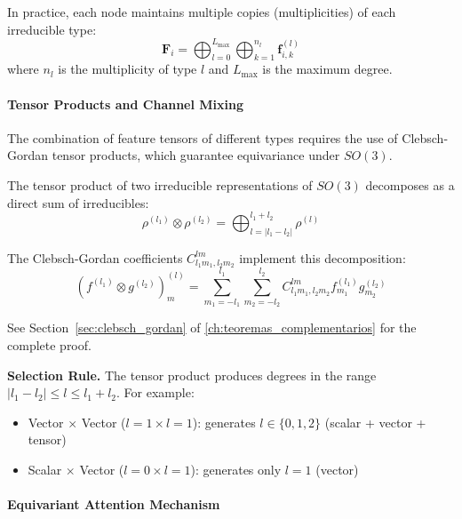 In practice, each node maintains multiple copies (multiplicities) of each irreducible type:
\begin{equation}
\mathbf{F}_i = \bigoplus_{l=0}^{L_{\max}} \bigoplus_{k=1}^{n_l} \mathbf{f}_{i,k}^{(l)}
\end{equation}
where $n_l$ is the multiplicity of type $l$ and $L_{\max}$ is the maximum degree.

\paragraph{Tensor Products and Channel Mixing}

The combination of feature tensors of different types requires the use of Clebsch-Gordan tensor products, which guarantee equivariance under $SO(3)$.

\begin{theorem}\label{thm:clebsch_gordan}
The tensor product of two irreducible representations of $SO(3)$ decomposes as a direct sum of irreducibles:
\begin{equation}
\rho^{(l_1)} \otimes \rho^{(l_2)} = \bigoplus_{l=|l_1-l_2|}^{l_1+l_2} \rho^{(l)}
\end{equation}

The Clebsch-Gordan coefficients $C_{l_1 m_1, l_2 m_2}^{l m}$ implement this decomposition:
\begin{equation}
(f^{(l_1)} \otimes g^{(l_2)})^{(l)}_m = \sum_{m_1=-l_1}^{l_1} \sum_{m_2=-l_2}^{l_2} C_{l_1 m_1, l_2 m_2}^{l m} f^{(l_1)}_{m_1} g^{(l_2)}_{m_2}
\end{equation}

See Section~\ref{sec:clebsch_gordan} of \autoref{ch:teoremas_complementarios} for the complete proof.
\end{theorem}

\textbf{Selection Rule.} The tensor product produces degrees in the range $|l_1 - l_2| \leq l \leq l_1 + l_2$. For example:
\begin{itemize}
    \item Vector $\times$ Vector ($l=1 \times l=1$): generates $l \in \{0, 1, 2\}$ (scalar + vector + tensor)
    \item Scalar $\times$ Vector ($l=0 \times l=1$): generates only $l=1$ (vector)
\end{itemize}

\paragraph{Equivariant Attention Mechanism}

